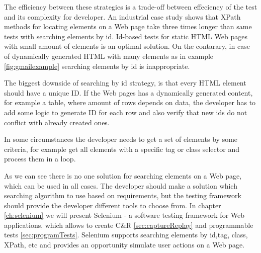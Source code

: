 		The efficiency between these strategies is a trade-off between effeciency of
		the test and its complexity for developer. An industrial case study shows that 
		XPath methods for locating elements on a Web page take 
		three times longer than same tests with searching
    elements by id\cite{selenium4}. 
	   Id-based tests for static HTML Web pages with small amount of elements
	   is an optimal solution. On the contarary, in case of dynamically
	   generated HTML with many elements as in example \ref{fig:gmailexample}
	   searching elements by id is inappropriate.
		
		The biggest downside of searching by id strategy, is that every HTML element
		should have a unique ID. If the Web pages has a dynamically generated content,
		for example a table, where amount of rows depends on data, the
		developer has to add some logic to generate ID for each row and also verify
		that new ids do not conflict with already created ones. 
		
		In some circumstances the developer needs to get a set of elements by some
		criteria, for example get all elements with a specific tag or class selector
		and process them in a loop. 
		
		As we can see there is no one solution for searching elements on a Web page,
		which can be used in all cases. The developer should make a solution which
		searching algorithm to use based on requirements, but the testing framework
		should provide the developer different tools to choose from. In chapter
		\ref{ch:selenium} we will present Selenium - a software testing framework
		for Web applications, which allows to create C\&R \ref{sec:captureReplay} and 
    programmable tests \ref{sec:programTests}. Selenium  supports searching
    elements by id,tag, class, XPath, etc and provides an opportunity simulate
    user actions on a Web page.
		

 